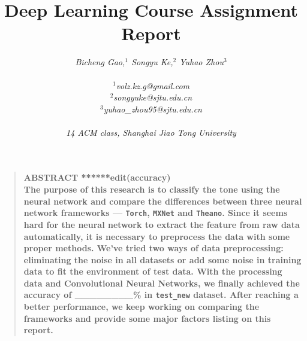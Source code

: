 \documentclass[12pt]{article}
\title{{\bf Deep Learning Course Assignment Report}}
\author
{{\it Bicheng Gao,$^{1}$ Songyu Ke,$^{2}$ Yuhao Zhou$^{3}$}\\
\\
\normalsize{{\it $^{1}$volz.kz.g@gmail.com}}\\
\normalsize{{\it $^{2}$songyuke@sjtu.edu.cn}}\\
\normalsize{{\it $^{3}$yuhao\_zhou95@sjtu.edu.cn}}\\
\\
\normalsize{{\it 14 ACM class, Shanghai Jiao Tong University}}
}
\date{}
\newenvironment{sciabstract}{%
\begin{quote} \bf}
{\end{quote}}
\begin{document}
 


\baselineskip24pt


\maketitle 




\begin{sciabstract}
{\bf ABSTRACT\/ ******edit(accuracy)} \\
The purpose of this research is to classify the tone using the neural network and compare the differences between three neural network frameworks --- \texttt{Torch}, \texttt{MXNet} and \texttt{Theano}. Since it seems hard for the neural network to extract the feature from raw data automatically, it is necessary to preprocess the data with some proper methods. We've tried two ways of data preprocessing: eliminating the noise in all datasets or add some noise in training data to fit the environment of test data. With the processing data and Convolutional Neural Networks, we finally achieved the accuracy of {\_\_\_\_\_\_\_\_\%} in \texttt{test\_new} dataset. After reaching a better performance, we keep working on comparing the frameworks and provide some major factors listing on this report.
\end{sciabstract}

\end{document}
